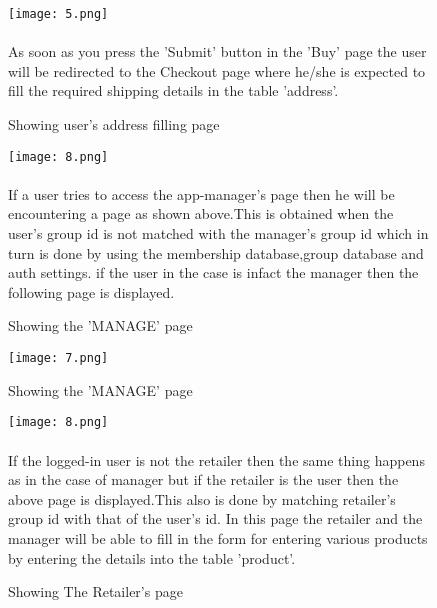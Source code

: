 \documentclass[a4paper]{article}
\begin{document}
\begin{figure}[h!]
\centering
\texttt{[image: 5.png]}
\caption{Showing user's address filling page}
\label{fig:User's page}
\paragraph{}
As soon as you press the 'Submit' button in the 'Buy' page the user will be redirected to the Checkout page where he/she is expected to fill the required shipping details in the table 'address'.
\end{figure}
\newpage

\begin{figure}[h!]
\centering
\texttt{[image: 8.png]}
\caption{Showing the 'MANAGE' page}
\label{fig:Manager's page}
\paragraph{}
If a user tries to access the app-manager's page then he will be encountering a page as shown above.This is obtained when the user's group id is not matched with the manager's group id which in turn is done by using the membership database,group database and auth settings.
if the user in the case is infact the manager then the following page is displayed.
\end{figure}
\newpage

\begin{figure}[h!]
\centering
\texttt{[image: 7.png]}
\caption{Showing the 'MANAGE' page}
\label{fig:Manager's page}
\end{figure}
\newpage

\begin{figure}[h!]
\centering
\texttt{[image: 8.png]}
\caption{Showing The Retailer's page}
\label{fig:Retailer's page}
\paragraph{}
If the logged-in user is not the retailer then the same thing happens as in the case of manager but if the retailer is the user then the above page is displayed.This also is done by matching retailer's group id with that of the user's id.
In this page the retailer and the manager will be able to fill in the form  for entering various products by entering the details into the table 'product'.
\end{figure}
\newpage






\end{document}
